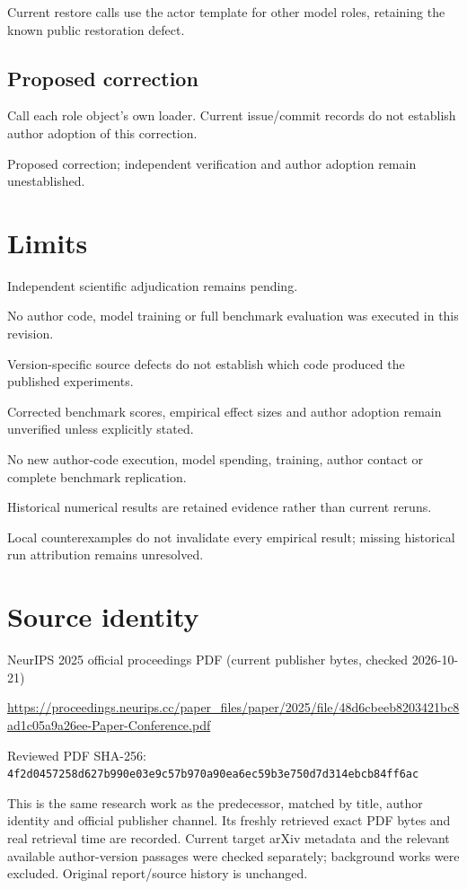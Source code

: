 \documentclass[11pt]{article}
\begin{document}
Current restore calls use the actor template for other model roles, retaining the known public restoration defect.

\subsection*{Proposed correction}

Call each role object’s own loader. Current issue/commit records do not establish author adoption of this correction.

Proposed correction; independent verification and author adoption remain unestablished.

\section*{Limits}

Independent scientific adjudication remains pending.\par

No author code, model training or full benchmark evaluation was executed in this revision.\par

Version-specific source defects do not establish which code produced the published experiments.\par

Corrected benchmark scores, empirical effect sizes and author adoption remain unverified unless explicitly stated.\par

No new author-code execution, model spending, training, author contact or complete benchmark replication.\par

Historical numerical results are retained evidence rather than current reruns.\par

Local counterexamples do not invalidate every empirical result; missing historical run attribution remains unresolved.\par

\section*{Source identity}

NeurIPS 2025 official proceedings PDF (current publisher bytes, checked 2026-10-21)

\url{https://proceedings.neurips.cc/paper_files/paper/2025/file/48d6cbeeb8203421bc8ad1c05a9a26ee-Paper-Conference.pdf}

Reviewed PDF SHA-256: \nolinkurl{4f2d0457258d627b990e03e9c57b970a90ea6ec59b3e750d7d314ebcb84ff6ac}

This is the same research work as the predecessor, matched by title, author identity and official publisher channel. Its freshly retrieved exact PDF bytes and real retrieval time are recorded. Current target arXiv metadata and the relevant available author-version passages were checked separately; background works were excluded. Original report/source history is unchanged.
\end{document}
